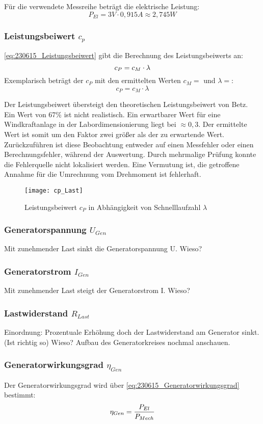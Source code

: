 Für die verwendete Messreihe beträgt die elektrische Leistung:
$$P_{El} = 3V \cdot 0,915A \approx 2,745W$$


\subsubsection*{Leistungsbeiwert $c_p$}
\autoref{eq:230615_Leistungsbeiwert} gibt die Berechnung des Leistungsbeiwerts an:
 \begin{equation}
     \centering
     c_P = c_M \cdot \lambda
     \label{eq:230615_Leistungsbeiwert}
 \end{equation}
Exemplarisch beträgt der $c_P$ mit den ermittelten Werten $c_M = $ und $\lambda =$:
 $$c_P = c_M \cdot \lambda$$

 Der Leistungsbeiwert übersteigt den theoretischen Leistungsbeiwert von Betz. Ein Wert von 67\% ist nicht realistisch. Ein erwartbarer Wert für eine Windkraftanlage in der Labordimensionierung liegt bei $\approx 0,3$. Der ermittelte Wert ist somit um den Faktor zwei größer als der zu erwartende Wert. Zurückzuführen ist diese Beobachtung entweder auf einen Messfehler oder einen Berechnungsfehler, während der Auswertung. Durch mehrmalige Prüfung konnte die Fehlerquelle nicht lokalisiert werden. Eine Vermutung ist, die getroffene Annahme für die Umrechnung vom Drehmoment ist fehlerhaft.
 \begin{figure}[H]
    \centering
    \texttt{[image: cp\_Last]}
    \caption{Leistungsbeiwert $c_P$ in Abhängigkeit von Schnelllaufzahl $\lambda$}
    \label{fig:cp_last}
\end{figure}
\subsubsection*{Generatorspannung $U_{Gen}$}
Mit zunehmender Last sinkt die Generatorspannung U. Wieso?
\subsubsection*{Generatorstrom $I_{Gen}$}
Mit zunehmender Last steigt der Generatorstrom I. Wieso?
\subsubsection*{Lastwiderstand $R_{Last}$}
Einordnung: Prozentuale Erhöhung doch der Lastwiderstand am Generator sinkt. (Ist richtig so) Wieso? Aufbau des Generatorkreises nochmal anschauen.
\subsubsection*{Generatorwirkungsgrad $\eta_{Gen}$}
Der Generatorwirkungsgrad wird über \autoref{eq:230615_Generatorwirkungsgrad} bestimmt:
\begin{equation}
    \centering
    \eta_{Gen} = \frac{P_{El}}{P_{Mech}}
    \label{eq:230615_Generatorwirkungsgrad}
\end{equation}

